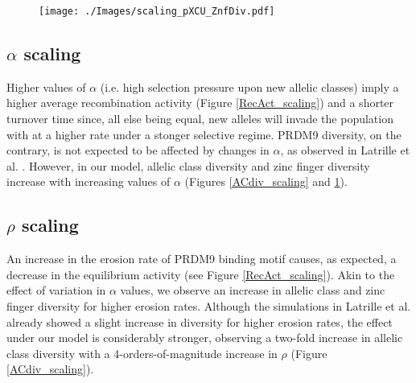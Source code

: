 \documentclass[a4paper,10pt]{article}
\begin{document}
\begin{figure}[htb]
\begin{center}
\leavevmode
\texttt{[image: ./Images/scaling\_pXCU\_ZnfDiv.pdf]}
\end{center}
\caption{\small{}}
\label{ZnfDiv_scaling}
\end{figure}






\subsection{$\alpha$ scaling}

Higher values of $\alpha$ (i.e. high selection pressure upon new allelic classes) imply a higher average recombination activity (Figure \ref{RecAct_scaling}) and a shorter turnover time  since, all else being equal, new alleles will invade the population with at a higher rate under a stonger selective regime. PRDM9 diversity, on the contrary, is not expected to be affected by changes in $\alpha$, as observed in Latrille et al. \cite{Latrille2017}. However, in our model, allelic class diversity and zinc finger diversity increase with increasing values of $\alpha$ (Figures \ref{ACdiv_scaling} and \ref{ZnfDiv_scaling}). 

\subsection{$\rho$ scaling}

An increase in the erosion rate of PRDM9 binding motif causes, as expected, a decrease in the equilibrium activity (see Figure \ref{RecAct_scaling}). Akin to the effect of variation in $\alpha$ values, we observe an increase in allelic class and zinc finger diversity for higher erosion rates. Although the simulations in Latrille et al. \cite{Latrille2017} already showed a slight increase in diversity for higher erosion rates, the effect under our model is considerably stronger, observing a two-fold increase in allelic class diversity with a 4-orders-of-magnitude increase in $\rho$ (Figure \ref{ACdiv_scaling}). 
\end{document}
